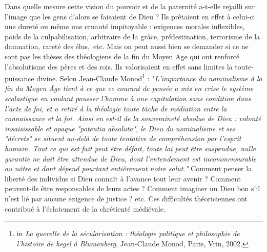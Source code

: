     
    Dans quelle mesure cette vision du pouvoir et de la paternité a-t-elle rejailli sur l'image que les gens d'alors se faisaient de Dieu ? Ils prêtaient en effet à celui-ci une dureté ou même une cruauté impitoyable : exigences morales inflexibles, poids de la culpabilisation, arbitraire de la grâce, prédestination, terrorisme de la damnation, rareté des élus,~etc. Mais on peut aussi bien se demander si ce ne sont pas les thèses des théologiens de la fin du Moyen Age qui ont renforcé l'absolutisme des pères et des rois. Ils valorisaient en effet sans limites la toute-puissance divine. Selon Jean-Claude Monod\footnote{ in \emph{La querelle de la sécularisation : théologie politique et philosophie de l'histoire de hegel à Blumenberg}, Jean-Claude Monod, Paris, Vrin, 2002.} : "\emph{L'importance du nominalisme à la fin du Moyen Âge tient à ce que ce courant de pensée a mis en crise le système scolastique en voulant pousser l'homme à une capitulation sans condition dans l'acte de foi, et a retiré à la théologie toute tâche de médiation entre la connaissance et la foi. Ainsi en est-il de la souveraineté absolue de Dieu : volonté insaisissable et opaque "potentia absoluta", le Dieu du nominalisme et ses "décrets" se situent au-delà de toute tentative de compréhension par l'esprit humain. Tout ce qui est fait peut être défait, toute loi peut être suspendue, nulle garantie ne doit être attendue de Dieu, dont l'entendement est incommensurable au nôtre et dont dépend pourtant entièrement notre salut."} Comment penser la liberté des individus si Dieu connaît à l'avance tout leur avenir ? Comment peuvent-ils être responsables de leurs actes ? Comment imaginer un Dieu bon s'il n'est lié par aucune exigence de justice ? etc. Ces difficultés théoriciennes ont contribué à l'éclatement de la chrétienté médiévale.       
    
